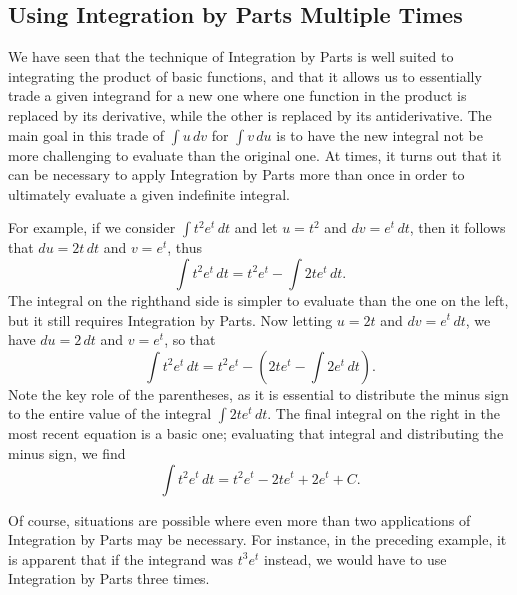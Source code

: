 


\subsection*{Using Integration by Parts Multiple Times} 

We have seen that the technique of Integration by Parts is well suited to integrating the product of basic functions, and that it allows us to essentially trade a given integrand for a new one where one function in the product is replaced by its derivative, while the other is replaced by its antiderivative.  The main goal in this trade of $\int u \, dv$ for $\int v \, du$ is to have the new integral not be more challenging to evaluate than the original one.  At times, it turns out that it can be necessary to apply Integration by Parts more than once in order to ultimately evaluate a given indefinite integral.

For example, if we consider $\int t^2 e^t \, dt$ and let $u = t^2$ and $dv = e^t \, dt$, then it follows that  $du = 2t \, dt$ and $v = e^t$, thus
$$\int t^2 e^t \, dt = t^2 e^t - \int 2t e^t \, dt.$$
The integral on the righthand side is simpler to evaluate than the one on the left, but it still requires Integration by Parts.  Now letting $u = 2t$ and $dv = e^t \, dt$, we have $du = 2\, dt$ and $v = e^t$, so that 
$$\int t^2 e^t \, dt = t^2 e^t - \left( 2t e^t - \int 2 e^t \, dt \right).$$
Note the key role of the parentheses, as it is essential to distribute the minus sign to the entire value of the integral $\int 2t e^t \, dt$.  The final integral on the right in the most recent equation is a basic one; evaluating that integral and distributing the minus sign, we find
$$\int t^2 e^t \, dt = t^2 e^t - 2t e^t +  2 e^t + C.$$

Of course, situations are possible where even more than two applications of Integration by Parts may be necessary.  For instance, in the preceding example, it is apparent that if the integrand was $t^3e^t$ instead, we would have to use Integration by Parts three times.

